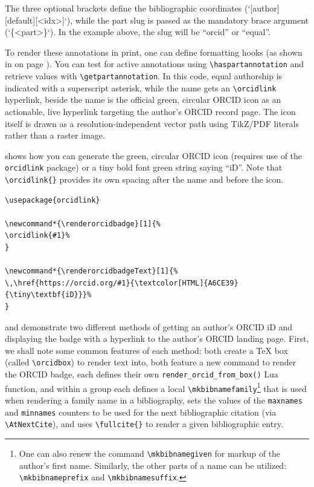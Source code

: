 \documentclass[12pt, twoside]{article}
\begin{document}
The three optional brackets define the bibliographic coordinates (`[author][default][<idx>]`), while the part slug is passed as the mandatory brace argument (`\{<part>\}`). In the example above, the slug will be \enquote{orcid} or \enquote{equal}.

To render these annotations in print, one can define \BibLaTeX{} formatting hooks (as shown in  on page \pageref{lst:biberHookExample1A}). You can test for active annotations using \texttt{\textbackslash haspartannotation} and retrieve values with \texttt{\textbackslash getpartannotation}. In this code, equal authorship is indicated with a superscript asterisk, while the name gets an  \texttt{\textbackslash orcidlink} hyperlink, \ie beside the name is the official green, circular \gls{ORCID} icon as an actionable, live hyperlink targeting the author's \gls{ORCID} record page. The icon itself is drawn as a resolution-independent vector path using TikZ/PDF literals rather than a raster image.

 shows how you can generate the green, circular \gls{ORCID} icon (requires use of the \texttt{orcidlink} package) or a tiny bold font green string saying \enquote{iD}. Note that \texttt{\textbackslash orcidlink\{\}} provides its own spacing after the name and before the icon.

\begin{lstlisting}[style=latexExampleForAuthors, escapechar=|, basicstyle=\footnotesize, caption={{ORCID icon or colored text}}, label=lst:biberHookIconOrText]
\usepackage{orcidlink}

\newcommand*{\renderorcidbadge}[1]{%
\orcidlink{#1}%
}

\newcommand*{\renderorcidbadgeText}[1]{%
\,\href{https://orcid.org/#1}{\textcolor[HTML]{A6CE39}{\tiny\textbf{iD}}}%
}
\end{lstlisting}

 and  demonstrate two different methods of getting an author's ORCID iD and displaying the badge with a hyperlink to the author's \gls{ORCID} landing page. First, we shall note some common features of each method:
both create a \TeX{} box (called \texttt{\textbackslash orcidbox}) to render text into, both feature a new command to render the \gls{ORCID} badge, each defines their own \texttt{render\_orcid\_from\_box()} Lua function, and within a group \first each defines a local \texttt{\textbackslash mkbibnamefamily}\footnote{One can also renew the command \texttt{\textbackslash mkbibnamegiven} for markup of the author's first name. Similarly, the other parts of a name can be utilized: \texttt{\textbackslash mkbibnameprefix} and
\texttt{\textbackslash mkbibnamesuffix}.} that is used when rendering a family name in a bibliography, \Second sets the values of the \texttt{maxnames} and \texttt{minnames} counters to be used for the next bibliographic citation (via 
\texttt{\textbackslash AtNextCite}), and \third uses \texttt{\textbackslash fullcite\{\}} to render a given bibliographic entry.
\end{document}
